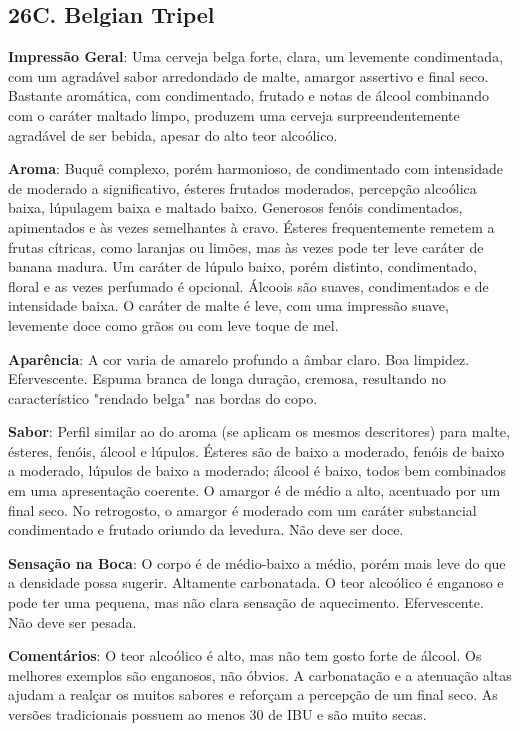 \subsection*{26C. Belgian Tripel}
\textbf{Impressão Geral}: Uma cerveja belga forte, clara, um levemente condimentada, com um agradável sabor arredondado de malte, amargor assertivo e final seco. Bastante aromática, com condimentado, frutado e notas de álcool combinando com o caráter maltado limpo, produzem uma cerveja surpreendentemente agradável de ser bebida, apesar do alto teor alcoólico.

\textbf{Aroma}: Buquê complexo, porém harmonioso, de condimentado com intensidade de moderado a significativo, ésteres frutados moderados, percepção alcoólica baixa, lúpulagem baixa e maltado baixo. Generosos fenóis condimentados, apimentados e às vezes semelhantes à cravo. Ésteres frequentemente remetem a frutas cítricas, como laranjas ou limões, mas às vezes pode ter leve caráter de banana madura. Um caráter de lúpulo baixo, porém distinto, condimentado, floral e as vezes perfumado é opcional. Álcoois são suaves, condimentados e de intensidade baixa. O caráter de malte é leve, com uma impressão suave, levemente doce como grãos ou com leve toque de mel.

\textbf{Aparência}: A cor varia de amarelo profundo a âmbar claro. Boa limpidez. Efervescente. Espuma branca de longa duração, cremosa, resultando no característico "rendado belga" nas bordas do copo.

\textbf{Sabor}: Perfil similar ao do aroma (se aplicam os mesmos descritores) para malte, ésteres, fenóis, álcool e lúpulos. Ésteres são de baixo a moderado, fenóis de baixo a moderado, lúpulos de baixo a moderado; álcool é baixo, todos bem combinados em uma apresentação coerente. O amargor é de médio a alto, acentuado por um final seco. No retrogosto, o amargor é moderado com um caráter substancial condimentado e frutado oriundo da levedura. Não deve ser doce.

\textbf{Sensação na Boca}: O corpo é de médio-baixo a médio, porém mais leve do que a densidade possa sugerir. Altamente carbonatada. O teor alcoólico é enganoso e pode ter uma pequena, mas não clara sensação de aquecimento. Efervescente. Não deve ser pesada.

\textbf{Comentários}: O teor alcoólico é alto, mas não tem gosto forte de álcool. Os melhores exemplos são enganosos, não óbvios. A carbonatação e a atenuação altas ajudam a realçar os muitos sabores e reforçam a percepção de um final seco. As versões tradicionais possuem ao menos 30 de IBU e são muito secas.

